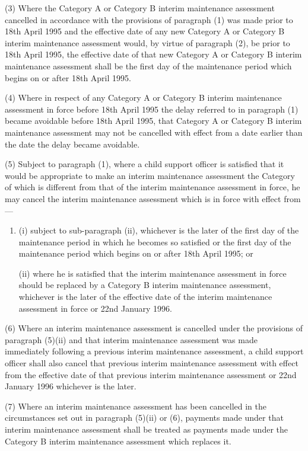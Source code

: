 \documentclass[a4paper]{article}
\begin{document}
(3) Where the Category A or Category B interim maintenance assessment cancelled in accordance with the provisions of paragraph (1) was made prior to 18th April 1995 and the effective date of any new Category A or Category B interim maintenance assessment would, by virtue of paragraph (2), be prior to 18th April 1995, the effective date of that new Category A or Category B interim maintenance assessment shall be the first day of the maintenance period which begins on or after 18th April 1995.

(4) Where in respect of any Category A or Category B interim maintenance assessment in force before 18th April 1995 the delay referred to in paragraph (1) became avoidable before 18th April 1995, that Category A or Category B interim maintenance assessment may not be cancelled with effect from a date earlier than the date the delay became avoidable.

(5) Subject to paragraph (1), where a child support officer is satisfied that it would be appropriate to make an interim maintenance assessment the Category of which is different from that of the interim maintenance assessment in force, he may cancel the interim maintenance assessment which is in force with effect from—
\begin{enumerate}\item[]
(i) subject to sub-paragraph (ii), whichever is the later of the first day of the maintenance period in which he becomes so satisfied or the first day of the maintenance period which begins on or after 18th April 1995; or

(ii) where he is satisfied that the interim maintenance assessment in force should be replaced by a Category B interim maintenance assessment, whichever is the later of the effective date of the interim maintenance assessment in force or 22nd January 1996.
\end{enumerate}

(6) Where an interim maintenance assessment is cancelled under the provisions of paragraph (5)(ii) and that interim maintenance assessment was made immediately following a previous interim maintenance assessment, a child support officer shall also cancel that previous interim maintenance assessment with effect from the effective date of that previous interim maintenance assessment or 22nd January 1996 whichever is the later.

(7) Where an interim maintenance assessment has been cancelled in the circumstances set out in paragraph (5)(ii) or (6), payments made under that interim maintenance assessment shall be treated as payments made under the Category B interim maintenance assessment which replaces it.
\end{document}
